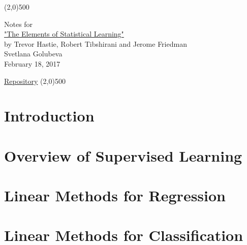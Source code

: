 \documentclass[a4paper,12pt,titlepage]{article} %
\begin{document}
\begin{titlepage}

\begin{center}
	\line(2,0){500}
\end{center}

\vspace{60pt}

\begin{center}	
	{\Large{Notes for}}\\
	\vspace{20pt}
	\href{http://www.springer.com/gp/book/9780387848570}{\Huge{"The Elements of 
Statistical Learning"}}\\
	\vspace{20pt}
	{\LARGE{by Trevor Hastie, Robert Tibshirani and Jerome Friedman}}\\
	\vspace{20pt}
	Svetlana Golubeva\\
	\vspace{20pt}
	February 18, 2017
\end{center}

\vspace{\fill}
\begin{center}
	\href{https://github.com/attillax/ESL}{Repository}
	\line(2,0){500}
\end{center}

\end{titlepage}

\tableofcontents
\newpage
\section{Introduction}


\newpage
\section{Overview of Supervised Learning}


\newpage
\section{Linear Methods for Regression}


\newpage
\section{Linear Methods for Classification}
\end{document}
